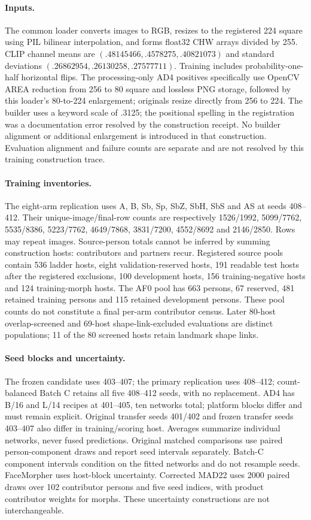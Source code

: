 \documentclass[10pt,twocolumn,letterpaper]{article}
\begin{document}
\paragraph{Inputs.}
The common loader converts images to RGB, resizes to the registered 224 square using PIL bilinear interpolation, and forms float32 CHW arrays divided by 255. CLIP channel means are $(.48145466,.4578275,.40821073)$ and standard deviations $(.26862954,.26130258,.27577711)$. Training includes probability-one-half horizontal flips. The processing-only AD4 positives specifically use OpenCV AREA reduction from 256 to 80 square and lossless PNG storage, followed by this loader's 80-to-224 enlargement; originals resize directly from 256 to 224. The builder uses a keyword scale of .3125; the positional spelling in the registration was a documentation error resolved by the construction receipt. No builder alignment or additional enlargement is introduced in that construction. Evaluation alignment and failure counts are separate and are not resolved by this training construction trace.

\paragraph{Training inventories.}
The eight-arm replication uses A, B, Sb, Sp, SbZ, SbH, SbS and AS at seeds 408--412. Their unique-image/final-row counts are respectively 1526/1992, 5099/7762, 5535/8386, 5223/7762, 4649/7868, 3831/7200, 4552/8692 and 2146/2850. Rows may repeat images. Source-person totals cannot be inferred by summing construction hosts: contributors and partners recur. Registered source pools contain 536 ladder hosts, eight validation-reserved hosts, 191 readable test hosts after the registered exclusions, 100 development hosts, 156 training-negative hosts and 124 training-morph hosts. The AF0 pool has 663 persons, 67 reserved, 481 retained training persons and 115 retained development persons. These pool counts do not constitute a final per-arm contributor census. Later 80-host overlap-screened and 69-host shape-link-excluded evaluations are distinct populations; 11 of the 80 screened hosts retain landmark shape links.

\paragraph{Seed blocks and uncertainty.}
The frozen candidate uses 403--407; the primary replication uses 408--412; count-balanced Batch C retains all five 408--412 seeds, with no replacement. AD4 has B/16 and L/14 recipes at 401--405, ten networks total; platform blocks differ and must remain explicit. Original transfer seeds 401/402 and frozen transfer seeds 403--407 also differ in training/scoring host. Averages summarize individual networks, never fused predictions. Original matched comparisons use paired person-component draws and report seed intervals separately. Batch-C component intervals condition on the fitted networks and do not resample seeds. FaceMorpher uses host-block uncertainty. Corrected MAD22 uses 2000 paired draws over 102 contributor persons and five seed indices, with product contributor weights for morphs. These uncertainty constructions are not interchangeable.
\end{document}

